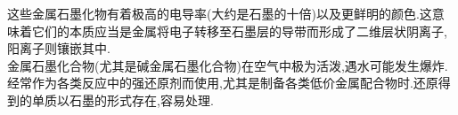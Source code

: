 \documentclass{ctexart}
\begin{document}
\begin{figure}[H]
    \centering
\end{figure}
这些金属石墨化物有着极高的电导率(大约是石墨的十倍)以及更鲜明的颜色.这意味着它们的本质应当是金属将电子转移至石墨层的导带而形成了二维层状阴离子,阳离子则镶嵌其中.\\
\indent 金属石墨化合物(尤其是碱金属石墨化合物)在空气中极为活泼,遇水可能发生爆炸.经常作为各类反应中的强还原剂而使用,尤其是制备各类低价金属配合物时.还原得到的单质以石墨的形式存在,容易处理.
\end{document}
